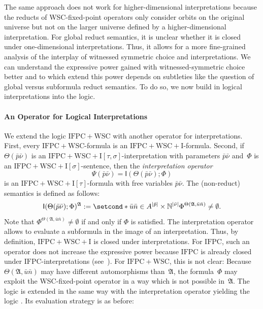 \documentclass[]{lmcs}
\newcommand{\nat}{\mathbb{N}}
\newcommand{\defining}[1]{\emph{#1}}
\newcommand{\numVarA}{\nu}
\newcommand{\formA}{\Phi}
\newcommand{\formB}{\Psi}
\newcommand{\interpret}{\Theta}
\newcommand{\tup}[1]{\bar{#1}}
\newcommand{\StructV}{A}
\newcommand{\vertA}{u}
\newcommand{\StructA}{\mathfrak{A}}
\newcommand{\sigA}{\tau}
\newcommand{\sigB}{\sigma}
\newcommand{\IFPC}{\ensuremath{\mathrm{IFPC}}}
\newcommand{\IFPCWSC}{\ensuremath{\mathrm{IFPC{+}WSC}}}
\newcommand{\IFPCWSCI}{\ensuremath{\mathrm{IFPC{+}WSC{+}I}}}
\newcommand{\ifpcwscisig}[1]{\ensuremath{\mathrm{IFPC{+}WSC{+}I}[#1]}}
\newcommand{\iop}[2]{\mathsf{I}(#1;#2)}
\begin{document}
The same approach does not work for higher-dimensional interpretations
because the reducts of WSC-fixed-point operators only consider orbits on the original universe but not on the larger universe defined by a higher-dimensional interpretation.
For global reduct semantics, it is unclear whether it is closed under one-dimensional interpretations.
Thus, it allows for a more fine-grained analysis of the interplay of witnessed symmetric choice and interpretations.
We can understand the expressive power gained with witnessed-symmetric choice 
better and to which extend this power depends on subtleties like the question of global versus subformula reduct semantics.
To do so, we now build in logical interpretations into the logic.

\paragraph{An Operator for Logical Interpretations}
We extend the logic \IFPCWSC{} with another operator for interpretations.
First, every \IFPCWSC{}-formula is an \IFPCWSCI{}-formula.
Second, if $\interpret(\tup{p}\tup{\numVarA})$ is an \ifpcwscisig{\sigA,\sigB}-interpretation
with parameters $\tup{p}\tup{\numVarA}$
and~$\formA$ is an \ifpcwscisig{\sigB}-sentence,
then the \defining{interpretation operator}
\[\formB(\tup{p}\tup{\numVarA}) = \iop{\interpret(\tup{p}\tup{\numVarA})}{ \formA}\]
is an $\ifpcwscisig{\sigA}$-formula with free variables $\tup{p}\tup{\numVarA}$.
The (non-reduct) semantics is defined as follows:
\[\iop{\interpret(\tup{p}\tup{\numVarA})}{\formA}^\StructA := 
\setcond*{\tup{\vertA}\tup{n}\in \StructV^{|\tup{p}|}\times\nat^{|\tup{\numVarA}|}}{ \formA^{\interpret(\StructA, \tup{\vertA}\tup{n})} \neq \emptyset}.\]
Note that $\formA^{\interpret(\StructA, \tup{\vertA}\tup{n})} \neq \emptyset$
if and only if $\formA$ is satisfied.
The interpretation operator allows to evaluate a subformula in the image of an interpretation.
Thus, by definition, \IFPCWSCI{} is closed under interpretations.
For \IFPC{}, such an operator does not increase the expressive power because \IFPC{} is already closed under \IFPC{}-interpretations (see~\cite{Otto1997}).
For \IFPCWSC{}, this is not clear:
Because $\interpret(\StructA, \tup{\vertA}\tup{n})$ may have different automorphisms than~$\StructA$,
the formula~$\formA$ may exploit the WSC-fixed-point operator in a way
which is not possible in~$\StructA$.
The logic \IFPCWSCglob{}
is extended in the same way with the interpretation operator
yielding the logic \IFPCWSCIglob{}.
Its evaluation strategy is as before:
\end{document}
